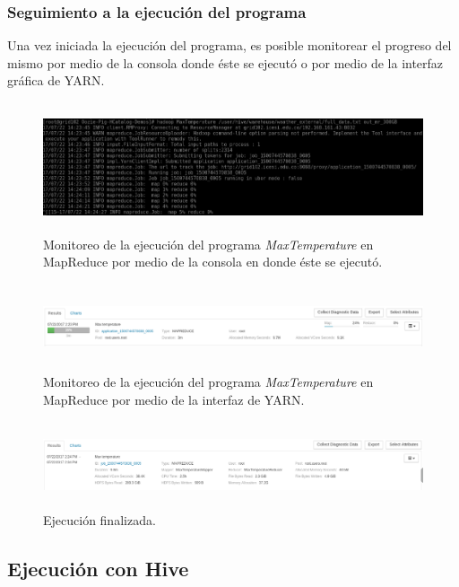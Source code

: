 \subsubsection{Seguimiento a la ejecución del programa}

Una vez iniciada la ejecución del programa, es posible monitorear el progreso del mismo por medio de la consola donde éste se ejecutó o por medio de la interfaz gráfica de YARN.

\begin{figure}[H]
  \centering
      \includegraphics[width=\textwidth, height=1.5in]{fig/04/00}
  \caption{Monitoreo de la ejecución del programa \textit{MaxTemperature} en MapReduce por medio de la consola en donde éste se ejecutó.}
\end{figure}

\begin{figure}[H]
  \centering
      \includegraphics[width=\textwidth, height=1.0in]{fig/04/01}
  \caption{Monitoreo de la ejecución del programa \textit{MaxTemperature} en MapReduce por medio de la interfaz de YARN.}
\end{figure}

\begin{figure}[H]
  \centering
      \includegraphics[width=\textwidth, height=1.0in]{fig/04/02}
  \caption{Ejecución finalizada.}
\end{figure}

\subsection{Ejecución con Hive}

